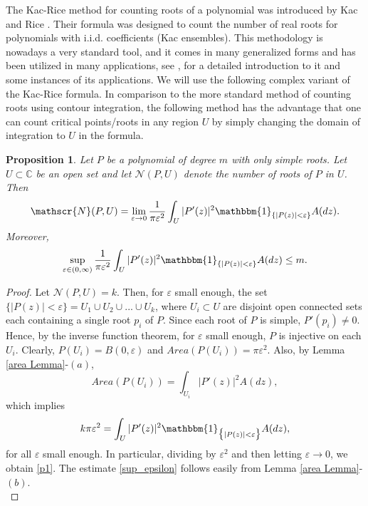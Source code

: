 \documentclass[9pt,a4paper,reqno]{amsart}
\theoremstyle{mine}
\newtheorem{prop}[thm]{Proposition}
\theoremstyle{definition}
\theoremstyle{remark}
\renewcommand\epsilon{\varepsilon}
\newcommand{\mb}{\mathbb}
\begin{document}
The Kac-Rice method for counting roots of a polynomial was introduced by Kac \cites{Kac-I, Kac-II} and Rice \cite{Rice-Mathematicalanalysisofrandomnoise}. Their formula was designed to count the number of real roots for polynomials with i.i.d. coefficients (Kac ensembles). This methodology is nowadays a very standard tool, and it comes in many generalized forms and has been utilized in many applications, see \cite[Chapter 3]{Hough-Krishnapur-Peres} \cite{berzin2022kacriceformulacontemporaryoverview}, \cites{lundberg-ramachandran-JLMS17, lerario-lundberg-PLMS16} for a detailed introduction to it and some instances of its applications. We will use the following complex variant of the Kac-Rice formula. In comparison to the more standard method of counting roots using contour integration, the following method has the advantage that one can count critical points/roots in any region $U$ by simply changing the domain of integration to $U$ in the formula. 

\begin{prop}\label{prior-kac-rice}
    Let $P$ be a polynomial of degree $m$ with only simple roots. Let $U \subset \mb{C}$ be an open set and let $\mathscr{N}(P,U)$ denote the number of roots of $P$ in $U$. Then 
     \begin{align}\label{p1}
        \mathscr{N}(P,U)  = \lim_{\epsilon \to 0} \frac{1}{\pi \epsilon^2} \int_{U} |P'(z)|^2 \mathbbm{1}_{\{|P(z)|<\epsilon\}} A(dz).
    \end{align}
    Moreover, 
    \begin{equation}\label{sup_epsilon}
        \sup_{\epsilon \in (0,\infty)} \frac{1}{\pi \epsilon^2} \int_{U} |P'(z)|^2 \mathbbm{1}_{\{|P(z)|<\epsilon\}} A(dz) \leq m .
    \end{equation}
\end{prop}

\begin{proof}
    Let $\mathscr{N}(P,U) = k$. Then, for $\epsilon$ small enough, the set $\{|P(z)| < \epsilon\} = U_1\cup U_2\cup...\cup U_k$, where $U_i\subset U$ are disjoint open connected sets each containing a single root $p_i$ of $P$. Since each root of $P$ is simple, $P'(p_i) \neq 0$. Hence, by the inverse function theorem, for $\epsilon$ small enough, $P$ is injective on each $U_i$. Clearly, $P(U_i) = B(0,\epsilon)$ and $Area(P(U_i)) = \pi \epsilon^2$.  Also, by Lemma \ref{area Lemma}-$(a)$, 
\[ Area(P(U_i)) = \int_{U_i} |P'(z)|^2 A(dz),\]
which implies 
\[ k\pi \epsilon^2 = \int_U |P'(z)|^2\mathbbm{1}_{\bigl\{|P(z)| < \epsilon\bigr\}} A(dz)  ,\]
for all $\epsilon$ small enough. In particular, dividing by $\epsilon^2$ and then letting $\epsilon \to 0$, we obtain \eqref{p1}. The estimate \eqref{sup_epsilon} follows easily from Lemma \ref{area Lemma}-$(b)$.\\
\end{proof}
\end{document}

